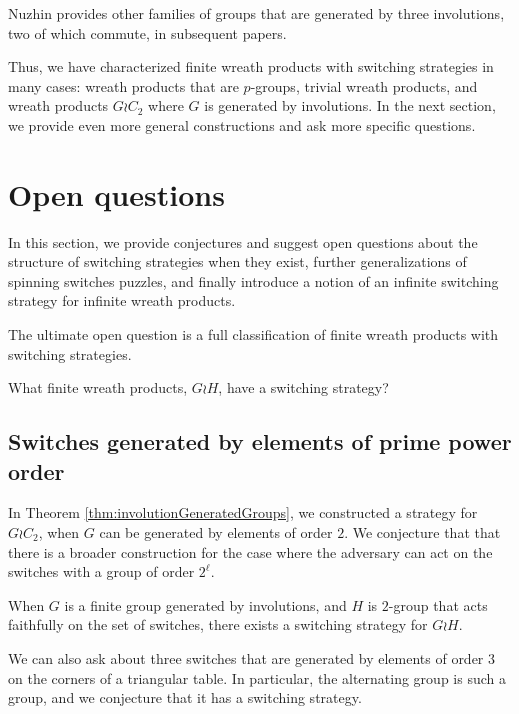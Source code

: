 Nuzhin provides other families of groups that are generated by three
involutions, two of which commute, in subsequent papers.
\cite{Nuzhin0,Nuzhin1,Nuzhin2}

Thus, we have characterized finite wreath products with switching strategies
in many cases:
wreath products that are $p$-groups,
trivial wreath products, and
wreath products $G \wr C_2$ where $G$ is generated by involutions.
In the next section, we provide even more general constructions and ask
more specific questions.

%
%
\section{Open questions}
\label{sec:OpenQuestions}
In this section, we provide conjectures and suggest open questions about
the structure of switching strategies when they exist,
further generalizations of spinning switches puzzles,
and finally introduce a notion of an infinite switching strategy for infinite
wreath products.

The ultimate open question is a full classification
of finite wreath products with switching strategies.
\begin{openquestion}
  What finite wreath products, $G \wr H$, have a switching strategy?
\end{openquestion}
\subsection{Switches generated by elements of prime power order}

In Theorem \ref{thm:involutionGeneratedGroups},
we constructed a strategy for $G \wr C_2$,
when $G$ can be generated by elements of order $2$.
We conjecture that that there is a broader construction for the case where
the adversary can act on the switches with a group of order $2^\ell$.

\begin{conjecture}
  When $G$ is a finite group generated by involutions, and
  $H$ is $2$-group that acts faithfully on the set of switches,
  there exists a switching strategy for $G \wr H$.
\end{conjecture}

We can also ask about three switches that are generated by elements of order
$3$ on the corners of a triangular table. In particular, the alternating group
is such a group, and we conjecture that it has a switching strategy.

